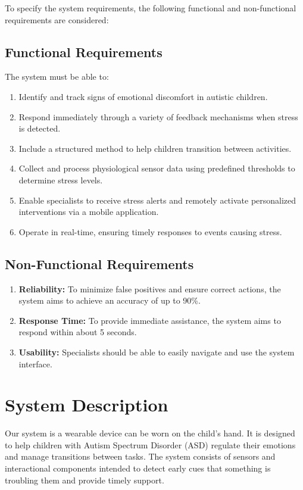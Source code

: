 \documentclass[a4paper,12pt]{report}
\begin{document}
To specify the system requirements, the following functional and non-functional requirements are considered:

\subsection{Functional Requirements}

The system must be able to:
\begin{enumerate}
    \item Identify and track signs of emotional discomfort in autistic children.
    \item Respond immediately through a variety of feedback mechanisms when stress is detected.
    \item Include a structured method to help children transition between activities.
    \item Collect and process physiological sensor data using predefined thresholds to determine stress levels.  
    \item Enable specialists to receive stress alerts and remotely activate personalized interventions via a mobile application.
    \item Operate in real-time, ensuring timely responses to events causing stress.
\end{enumerate}

\subsection{Non-Functional Requirements}

\begin{enumerate}
    \item \textbf{Reliability:}  To minimize false positives and ensure correct actions, the system aims to achieve an accuracy of up to 90\%.
    \item \textbf{Response Time:} To provide immediate assistance, the system aims to respond within about 5 seconds.
    \item \textbf{Usability:} Specialists should be able to easily navigate and use the system interface.
\end{enumerate}

\section{System Description}
Our system is a wearable device can be worn on the child’s hand. It is designed to help children with Autism Spectrum Disorder (ASD) regulate their emotions and manage transitions between tasks. The system consists of sensors and interactional components intended to detect early cues that something is troubling them and provide timely support.
\end{document}
